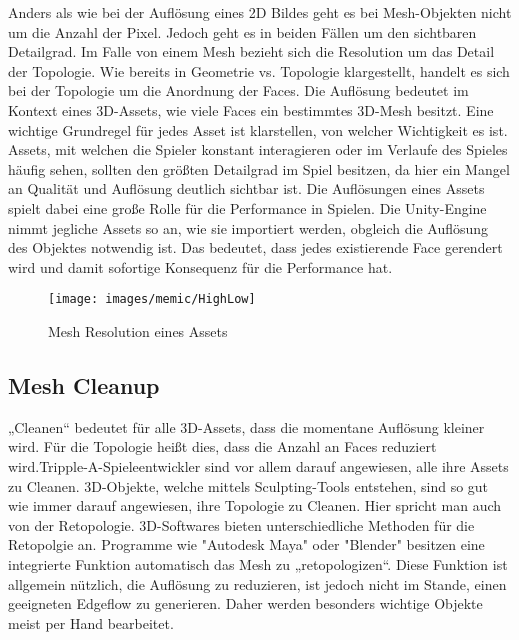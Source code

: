 Anders als wie bei der Auflösung eines 2D Bildes geht es bei Mesh-Objekten nicht um die Anzahl der Pixel. Jedoch geht es in beiden Fällen um den sichtbaren Detailgrad. Im Falle von einem Mesh bezieht sich die Resolution um das Detail der Topologie. Wie bereits in Geometrie vs. Topologie klargestellt, handelt es sich bei der Topologie um die Anordnung der Faces. Die Auflösung bedeutet im Kontext eines 3D-Assets, wie viele Faces ein bestimmtes 3D-Mesh besitzt. Eine wichtige Grundregel für jedes Asset ist klarstellen, von welcher Wichtigkeit es ist. Assets, mit welchen die Spieler konstant interagieren oder im Verlaufe des Spieles häufig sehen, sollten den größten Detailgrad im Spiel besitzen, da hier ein Mangel an Qualität und Auflösung deutlich sichtbar ist. Die Auflösungen eines Assets spielt dabei eine große Rolle für die Performance in Spielen. Die Unity-Engine nimmt jegliche Assets so an, wie sie importiert werden, obgleich die Auflösung des Objektes notwendig ist. Das bedeutet, dass jedes existierende Face gerendert wird und damit sofortige Konsequenz für die Performance hat.\cite[16]{_3d_modeling_pipline}

\begin{figure}[H]
	\centering
	\texttt{[image: images/memic/HighLow]}
	\caption{Mesh Resolution eines Assets}
\end{figure}
\cite{_meshResolution}

\subsection{Mesh Cleanup}

„Cleanen“ bedeutet für alle 3D-Assets, dass die momentane Auflösung kleiner wird. Für die Topologie heißt dies, dass die Anzahl an Faces reduziert wird.\cite[S.152]{_unity_game_optimization}Tripple-A-Spieleentwickler sind vor allem darauf angewiesen, alle ihre Assets zu Cleanen. 3D-Objekte, welche mittels Sculpting-Tools entstehen, sind so gut wie immer darauf angewiesen, ihre Topologie zu Cleanen.\cite[S.14]{_3d_modeling_pipline} Hier spricht man auch von der Retopologie. 3D-Softwares bieten unterschiedliche Methoden für die Retopolgie an. Programme wie "Autodesk Maya" oder "Blender" besitzen eine integrierte Funktion automatisch das Mesh zu „retopologizen“. Diese Funktion ist allgemein nützlich, die Auflösung zu reduzieren, ist jedoch nicht im Stande, einen geeigneten Edgeflow zu generieren.\cite[S.15]{_3d_modeling_pipline} Daher werden besonders wichtige Objekte meist per Hand bearbeitet.

